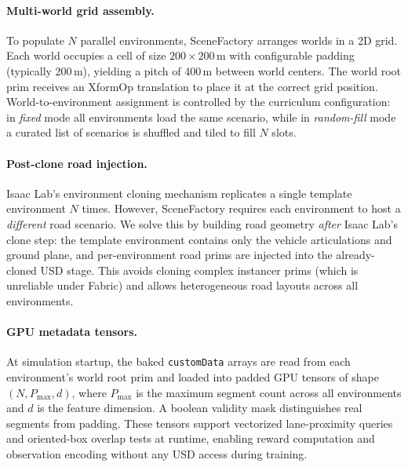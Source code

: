 \paragraph{Multi-world grid assembly.}
To populate $N$ parallel environments, SceneFactory arranges worlds in a 2D grid.
Each world occupies a cell of size $200 \times 200$\,m with configurable padding (typically 200\,m), yielding a pitch of 400\,m between world centers.
The world root prim receives an XformOp translation to place it at the correct grid position.
World-to-environment assignment is controlled by the curriculum configuration: in \emph{fixed} mode all environments load the same scenario, while in \emph{random-fill} mode a curated list of scenarios is shuffled and tiled to fill $N$ slots.

\paragraph{Post-clone road injection.}
Isaac Lab's environment cloning mechanism replicates a single template environment $N$ times.
However, SceneFactory requires each environment to host a \emph{different} road scenario.
We solve this by building road geometry \emph{after} Isaac Lab's clone step: the template environment contains only the vehicle articulations and ground plane, and per-environment road prims are injected into the already-cloned USD stage.
This avoids cloning complex instancer prims (which is unreliable under Fabric) and allows heterogeneous road layouts across all environments.

\paragraph{GPU metadata tensors.}
At simulation startup, the baked \texttt{customData} arrays are read from each environment's world root prim and loaded into padded GPU tensors of shape $(N, P_{\max}, d)$, where $P_{\max}$ is the maximum segment count across all environments and $d$ is the feature dimension.
A boolean validity mask distinguishes real segments from padding.
These tensors support vectorized lane-proximity queries and oriented-box overlap tests at runtime, enabling reward computation and observation encoding without any USD access during training.




